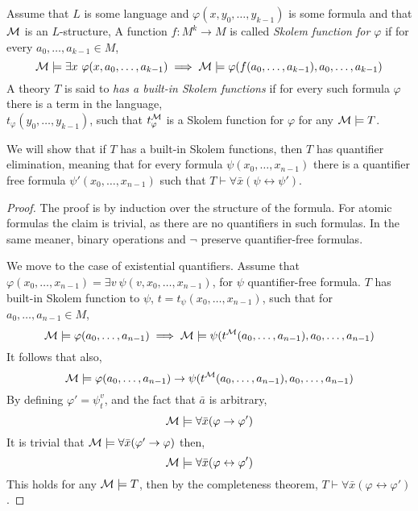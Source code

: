 \question{}
Assume that $L$ is some language and $\varphi(x, y_0, \ldots, y_{k - 1})$ is some formula and that $\mathcal{M}$ is an $L$-structure,
A function $f : M^k \to M$ is called \textit{Skolem function for $\varphi$} if for every $a_0, \ldots, a_{k - 1} \in M$,
\[
	\mathcal{M} \models \exists x\ \varphi(x, a_0, \ldots, a_{k - 1})
	\implies \mathcal{M} \models \varphi(f(a_0, \ldots, a_{k - 1}), a_0, \ldots, a_{k - 1})
\]
A theory $T$ is said to \textit{has a built-in Skolem functions} if for every such formula $\varphi$ there is a term in the language, \\
$t_{\varphi}(y_0, \ldots, y_{k - 1})$, such that $t_\varphi^{\mathcal{M}}$ is a Skolem function for $\varphi$ for any $\mathcal{M} \models T$.

\subquestion{}
We will show that if $T$ has a built-in Skolem functions, then $T$ has quantifier elimination,
meaning that for every formula $\psi(x_0, \ldots, x_{n - 1})$ there is a quantifier free formula $\psi'(x_0, \ldots, x_{n - 1})$ such that $T \vdash \forall \bar{x} (\psi \leftrightarrow \psi')$.
\begin{proof}
	The proof is by induction over the structure of the formula.
	For atomic formulas the claim is trivial, as there are no quantifiers in such formulas.
	In the same meaner, binary operations and $\lnot$ preserve quantifier-free formulas.

	We move to the case of existential quantifiers.
	Assume that $\varphi(x_0, \ldots, x_{n - 1}) = \exists v\ \psi(v, x_0, \ldots, x_{n - 1})$, for $\psi$ quantifier-free formula.
	$T$ has built-in Skolem function to $\psi$, $t = t_{\psi}(x_0, \ldots, x_{n - 1})$, such that for $a_0, \ldots, a_{n - 1} \in M$,
	\[
		\mathcal{M} \models \varphi(a_0, \ldots, a_{n - 1})
		\implies \mathcal{M} \models \psi(t^{\mathcal{M}}(a_0, \ldots, a_{n - 1}), a_0, \ldots, a_{n - 1})
	\]
	It follows that also,
	\[
		\mathcal{M} \models \varphi(a_0, \ldots, a_{n - 1}) \to \psi(t^{\mathcal{M}}(a_0, \ldots, a_{n - 1}), a_0, \ldots, a_{n - 1})
	\]
	By defining $\varphi' = \psi_t^v$, and the fact that $\bar{a}$ is arbitrary,
	\[
		\mathcal{M} \models \forall \bar{x} (\varphi \to \varphi')
	\]
	It is trivial that $\mathcal{M} \models \forall \bar{x} (\varphi' \to \varphi)$ then,
	\[
		\mathcal{M} \models \forall \bar{x} (\varphi \leftrightarrow \varphi')
	\]
	This holds for any $\mathcal{M} \models T$, then by the completeness theorem, $T \vdash \forall \bar{x} (\varphi \leftrightarrow \varphi')$.
\end{proof}


